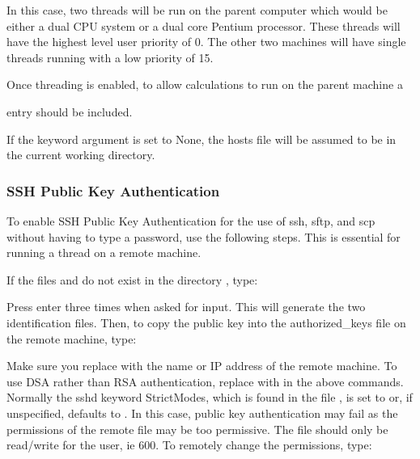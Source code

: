 In this case, two threads will be run on the parent computer which would be either a dual
CPU system or a dual core 
 Pentium processor.  These threads will have the
highest level user priority of 0.  The other two machines will have single threads running
with a low priority of 15.

Once threading is enabled, to allow calculations to run on the parent machine a 

entry should be included.


If the keyword argument 
 is set to None, the hosts file will be assumed to be in the
current working directory.


\subsubsection{SSH Public Key Authentication}

To enable SSH Public Key Authentication for the use of ssh, sftp, and scp without having to
type a password, use the following steps.  This is essential for running a thread on a
remote machine.

If the files 
 and 
 do not exist in the directory 
, type:



Press enter three times when asked for input.  This will generate the two identification
files.  Then, to copy the public key into the authorized\_keys file on the remote machine,
type:



Make sure you replace 
 with the name or IP address of the remote machine.  To use
DSA rather than RSA authentication, replace 
 with 
 in the above commands.
Normally the sshd keyword StrictModes, which is found in the file 
, is
set to 
 or, if unspecified, defaults to 
.  In this case, public key authentication
may fail as the permissions of the remote file 
 may be too
permissive.  The file should only be read/write for the user, ie 600.  To remotely change
the permissions, type:



